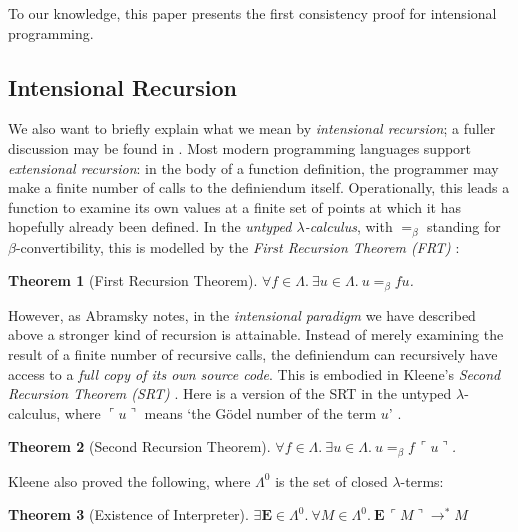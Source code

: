 \documentclass{myifcolog}
\newtheorem{thm}{Theorem}
\theoremstyle{definition}
\begin{document}
To our knowledge, this paper presents the first consistency proof
for intensional programming.

\subsection{Intensional Recursion}

We also want to briefly explain what we mean by \emph{intensional
recursion}; a fuller discussion may be found in
\cite{Abramsky2014,Kavvos2017}. Most modern programming languages
support \emph{extensional recursion}: in the body of a function
definition, the programmer may make a finite number of calls to
the definiendum itself. Operationally, this leads a function to
examine its own values at a finite set of points at which it has
hopefully already been defined. In the \emph{untyped
$\lambda$-calculus}, with $=_\beta$ standing for
$\beta$-convertibility, this is modelled by the \emph{First
Recursion Theorem (FRT)} \cite[\S 6.1]{Barendregt1984}:

\begin{thm}
  [First Recursion Theorem]
  $\forall f \in \Lambda.\
  \exists u \in \Lambda.\
  u =_\beta fu$.
\end{thm}

However, as Abramsky \cite{Abramsky2014} notes, in the
\emph{intensional paradigm} we have described above a stronger
kind of recursion is attainable. Instead of merely examining the
result of a finite number of recursive calls, the definiendum can
recursively have access to a \emph{full copy of its own source
code}. This is embodied in Kleene's \emph{Second Recursion Theorem
(SRT)} \cite{Kleene1938}. Here is a version of the SRT in the
untyped $\lambda$-calculus, where $\ulcorner u \urcorner$ means
`the G\"odel number of the term $u$' \cite[\S 6.5, Thm.
6.5.9]{Barendregt1984}.

\begin{thm}
  [Second Recursion Theorem]
  $\forall f \in \Lambda.\
  \exists u \in \Lambda.\
    u =_\beta f \, \ulcorner u \urcorner$.
\end{thm}

\noindent Kleene also proved the following, where $\Lambda^0$ is
the set of closed $\lambda$-terms:

\begin{thm}
  [Existence of Interpreter]
  \label{thm:lambdainterp}
  $\exists \mathbf{E} \in \Lambda^0.\
  \forall M \in \Lambda^0.\
  \mathbf{E} \, \ulcorner M \urcorner \rightarrow^\ast M$
\end{thm}
\end{document}
